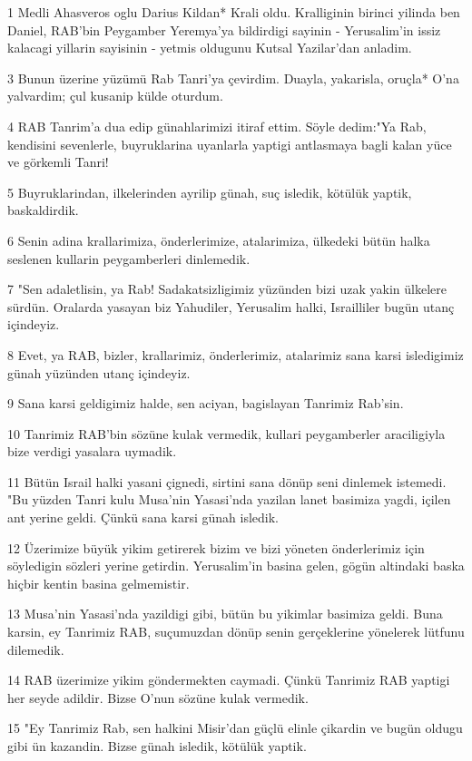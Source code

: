 \par 1 Medli Ahasveros oglu Darius Kildan* Krali oldu. Kralliginin birinci yilinda ben Daniel, RAB'bin Peygamber Yeremya'ya bildirdigi sayinin - Yerusalim'in issiz kalacagi yillarin sayisinin - yetmis oldugunu Kutsal Yazilar'dan anladim.
\par 3 Bunun üzerine yüzümü Rab Tanri'ya çevirdim. Duayla, yakarisla, oruçla* O'na yalvardim; çul kusanip külde oturdum.
\par 4 RAB Tanrim'a dua edip günahlarimizi itiraf ettim. Söyle dedim:"Ya Rab, kendisini sevenlerle, buyruklarina uyanlarla yaptigi antlasmaya bagli kalan yüce ve görkemli Tanri!
\par 5 Buyruklarindan, ilkelerinden ayrilip günah, suç isledik, kötülük yaptik, baskaldirdik.
\par 6 Senin adina krallarimiza, önderlerimize, atalarimiza, ülkedeki bütün halka seslenen kullarin peygamberleri dinlemedik.
\par 7 "Sen adaletlisin, ya Rab! Sadakatsizligimiz yüzünden bizi uzak yakin ülkelere sürdün. Oralarda yasayan biz Yahudiler, Yerusalim halki, Israilliler bugün utanç içindeyiz.
\par 8 Evet, ya RAB, bizler, krallarimiz, önderlerimiz, atalarimiz sana karsi isledigimiz günah yüzünden utanç içindeyiz.
\par 9 Sana karsi geldigimiz halde, sen aciyan, bagislayan Tanrimiz Rab'sin.
\par 10 Tanrimiz RAB'bin sözüne kulak vermedik, kullari peygamberler araciligiyla bize verdigi yasalara uymadik.
\par 11 Bütün Israil halki yasani çignedi, sirtini sana dönüp seni dinlemek istemedi. "Bu yüzden Tanri kulu Musa'nin Yasasi'nda yazilan lanet basimiza yagdi, içilen ant yerine geldi. Çünkü sana karsi günah isledik.
\par 12 Üzerimize büyük yikim getirerek bizim ve bizi yöneten önderlerimiz için söyledigin sözleri yerine getirdin. Yerusalim'in basina gelen, gögün altindaki baska hiçbir kentin basina gelmemistir.
\par 13 Musa'nin Yasasi'nda yazildigi gibi, bütün bu yikimlar basimiza geldi. Buna karsin, ey Tanrimiz RAB, suçumuzdan dönüp senin gerçeklerine yönelerek lütfunu dilemedik.
\par 14 RAB üzerimize yikim göndermekten caymadi. Çünkü Tanrimiz RAB yaptigi her seyde adildir. Bizse O'nun sözüne kulak vermedik.
\par 15 "Ey Tanrimiz Rab, sen halkini Misir'dan güçlü elinle çikardin ve bugün oldugu gibi ün kazandin. Bizse günah isledik, kötülük yaptik.
